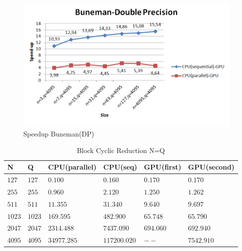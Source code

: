 \begin{figure}[H]
   \centering
       \includegraphics[width=1\textwidth]{grafhmata/buneman_dp_speedup.png}
   \caption{Speedup Buneman(DP)}
   \label{fig:Speedup Buneman(DP)}
\end{figure}

   \begin{table}[H]
\caption{Block Cyclic Reduction N=Q} 
\centering 
\begin{tabular}{| l |  p{1cm} |p{}| p{} |  p{}| p{} | } 
\hline\hline 
N & Q & CPU(parallel) & CPU(seq) & GPU(first)  & GPU(second)\\ [0.8ex] 
\hline
$127$ &	$127$ & $0.100$	&	$0.160$ & $0.170$ & $0.170$ \\
$255$ &	$255$ & $0.960$	&	$2.120$ & $1.250$ & $1.262$ \\
$511$ &	$511$ & $11.355$	&	$31.340$ & $9.640$ & $9.697$ \\
$1023$ &	$1023$ & $169.595$	&	$482.900$ & $65.748$ & $65.790$ \\
$2047$ &	$2047$ & $2314.488$	&	$7437.090$ & $694.060$ & $692.940$ \\
$4095$ & $4095$  & $34977.285$	&  $117200.020$ & $--$ & $7542.910$ \\[1ex]
\hline 
\end{tabular}
\label{table:bcr_n=q} 
\end{table} 

